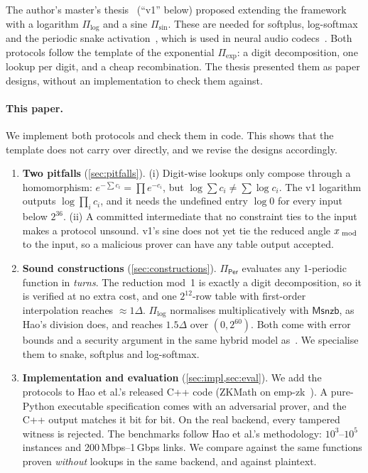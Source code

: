 \documentclass[10pt,twocolumn]{article}
\theoremstyle{remark}
\newcommand{\Msnzb}{\mathsf{Msnzb}}
\newcommand{\ulp}{\Delta}
\begin{document}
The author's master's thesis~\cite{chen2025thesis} (``v1'' below) proposed extending the framework
with a logarithm $\Pi_{\log}$ and a sine $\Pi_{\sin}$. These are needed for softplus, log-softmax
and the periodic snake activation~\cite{ziyin2020snake}, which is used in neural audio
codecs~\cite{kumar2023dac}. Both protocols follow the template of the exponential $\Pi_{\exp}$: a
digit decomposition, one lookup per digit, and a cheap recombination. The thesis presented them as
paper designs, without an implementation to check them against.

\paragraph{This paper.} We implement both protocols and check them in code. This shows that the
template does not carry over directly, and we revise the designs accordingly.
\begin{enumerate}
\item \textbf{Two pitfalls} (\cref{sec:pitfalls}). (i) Digit-wise lookups only compose through a
homomorphism: $e^{-\sum c_i}=\prod e^{-c_i}$, but $\log\sum c_i\neq\sum\log c_i$. The v1 logarithm
outputs $\log\prod_i c_i$, and it needs the undefined entry $\log 0$ for every input below
$2^{36}$. (ii) A committed intermediate that no constraint ties to the input makes a protocol
unsound. v1's sine does not yet tie the reduced angle $x_{\bmod}$ to the input, so a malicious
prover can have any table output accepted.
\item \textbf{Sound constructions} (\cref{sec:constructions}). $\Pi_{\mathsf{Per}}$ evaluates any
1-periodic function in \emph{turns}. The reduction mod~1 is exactly a digit decomposition, so it is
verified at no extra cost, and one $2^{12}$-row table with first-order interpolation reaches
$\approx\!1\ulp$. $\Pi_{\log}$ normalises multiplicatively with $\Msnzb$, as Hao's division does,
and reaches $1.5\ulp$ over $(0,2^{60})$. Both come with error bounds and a security argument in the
same hybrid model as~\cite{hao2024scalable}. We specialise them to snake, softplus and log-softmax.
\item \textbf{Implementation and evaluation} (\cref{sec:impl,sec:eval}). We add the protocols to
Hao et al.'s released C++ code (ZKMath on emp-zk~\cite{emptoolkit}). A pure-Python executable
specification comes with an adversarial prover, and the C++ output matches it bit for bit. On the
real backend, every tampered witness is rejected. The benchmarks follow Hao et al.'s methodology:
$10^3$--$10^5$ instances and 200\,Mbps--1\,Gbps links. We compare against the same functions
proven \emph{without} lookups in the same backend, and against plaintext.
\end{enumerate}
\end{document}

